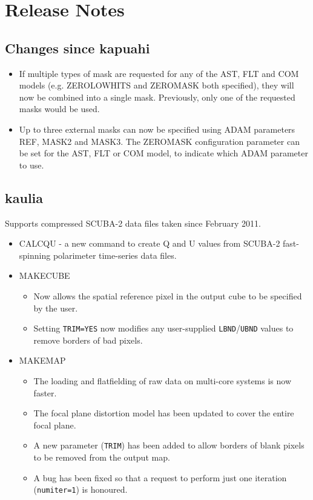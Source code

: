 \documentclass[twoside,11pt]{article}
\renewcommand{\_}{\texttt{\symbol{95}}}
\begin{document}
\section{Release Notes}

\subsection{Changes since kapuahi}

\begin{itemize}
\item If multiple types of mask are requested for any of the AST, FLT
and COM models (e.g. ZERO\_LOWHITS and ZERO\_MASK both specified),
they will now be combined into a single mask. Previously, only one
of the requested masks would be used.
\item Up to three external masks can now be specified using ADAM parameters
REF, MASK2 and MASK3. The ZERO\_MASK configuration parameter can be set
for the AST, FLT or COM model, to indicate which ADAM parameter to use.
\end{itemize}

\subsection{kaulia}

Supports compressed SCUBA-2 data files taken since February 2011.

\begin{itemize}
\item CALCQU - a new command to create Q and U values from SCUBA-2
  fast-spinning polarimeter time-series data files.
\item MAKECUBE
\begin{itemize}
\item Now allows the spatial reference pixel in the output cube to be
  specified by the user.
\item Setting \texttt{TRIM=YES} now modifies any user-supplied
  \texttt{LBND}/\texttt{UBND} values to remove borders of bad pixels.
\end{itemize}
\item MAKEMAP
\begin{itemize}
\item The loading and flatfielding of raw data on multi-core systems
  is now faster.
\item The focal plane distortion model has been updated to cover the
  entire focal plane.
\item A new parameter (\texttt{TRIM}) has been added to allow borders
  of blank pixels to be removed from the output map.
\item A bug has been fixed so that a request to perform just one
  iteration (\texttt{numiter=1}) is honoured.
\end{itemize}
\end{itemize}
\end{document}
